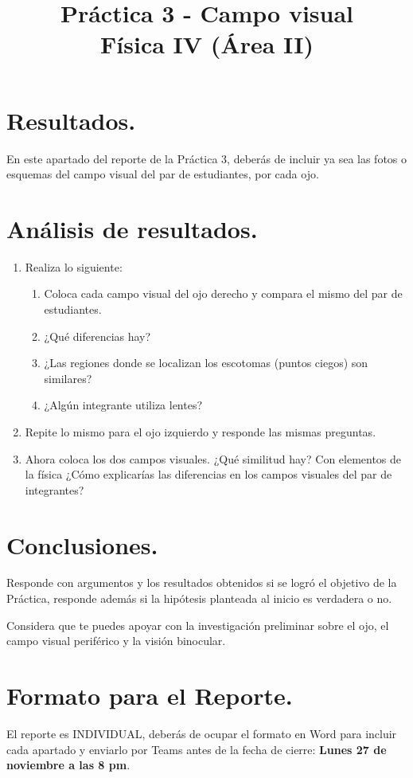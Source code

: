 \documentclass[14pt]{extarticle}
\title{\vspace*{-2cm} Práctica 3 - Campo visual \\  Física IV (Área II) \vspace{-5ex}}
\date{}
\begin{document}
\maketitle

\section{Resultados.}

En este apartado del reporte de la Práctica 3, deberás de incluir ya sea las fotos o esquemas del campo visual del par de estudiantes, por cada ojo.

\section{Análisis de resultados.}

\begin{enumerate}
\item Realiza lo siguiente:
\begin{enumerate}
\itemsep0.5em 
\item Coloca cada campo visual del ojo derecho y compara el mismo del par de estudiantes.
\item ¿Qué diferencias hay?
\item ¿Las regiones donde se localizan los escotomas (puntos ciegos) son similares?
\item ¿Algún integrante utiliza lentes?
\end{enumerate}
\item Repite lo mismo para el ojo izquierdo y responde las mismas preguntas.
\item Ahora coloca los dos campos visuales. ¿Qué similitud hay? Con elementos de la física ¿Cómo explicarías las diferencias en los campos visuales del par de integrantes?
\end{enumerate}

\section{Conclusiones.}

Responde con argumentos y los resultados obtenidos si se logró el objetivo de la Práctica, responde además si la hipótesis planteada al inicio es verdadera o no.

Considera que te puedes apoyar con la investigación preliminar sobre el ojo, el campo visual periférico y la visión binocular.

\section{Formato para el Reporte.}

El reporte es INDIVIDUAL, deberás de ocupar el formato en Word para incluir cada apartado y enviarlo por Teams antes de la fecha de cierre: \textbf{Lunes 27 de noviembre a las 8 pm}.
\end{document}
